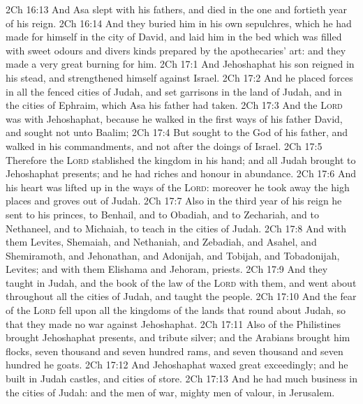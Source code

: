 \vs 2Ch 16:13 And Asa slept with his fathers, and died in the one and fortieth year of his reign.
\vs 2Ch 16:14 And they buried him in his own sepulchres, which he had made for himself in the city of David, and laid him in the bed which was filled with sweet odours and divers kinds  prepared by the apothecaries' art: and they made a very great burning for him.
\vs 2Ch 17:1 And Jehoshaphat his son reigned in his stead, and strengthened himself against Israel.
\vs 2Ch 17:2 And he placed forces in all the fenced cities of Judah, and set garrisons in the land of Judah, and in the cities of Ephraim, which Asa his father had taken.
\vs 2Ch 17:3 And the \textsc{Lord} was with Jehoshaphat, because he walked in the first ways of his father David, and sought not unto Baalim;
\vs 2Ch 17:4 But sought to the  God of his father, and walked in his commandments, and not after the doings of Israel.
\vs 2Ch 17:5 Therefore the \textsc{Lord} stablished the kingdom in his hand; and all Judah brought to Jehoshaphat presents; and he had riches and honour in abundance.
\vs 2Ch 17:6 And his heart was lifted up in the ways of the \textsc{Lord}: moreover he took away the high places and groves out of Judah.
\vs 2Ch 17:7 Also in the third year of his reign he sent to his princes,  to Benhail, and to Obadiah, and to Zechariah, and to Nethaneel, and to Michaiah, to teach in the cities of Judah.
\vs 2Ch 17:8 And with them  Levites,  Shemaiah, and Nethaniah, and Zebadiah, and Asahel, and Shemiramoth, and Jehonathan, and Adonijah, and Tobijah, and Tobadonijah, Levites; and with them Elishama and Jehoram, priests.
\vs 2Ch 17:9 And they taught in Judah, and  the book of the law of the \textsc{Lord} with them, and went about throughout all the cities of Judah, and taught the people.
\vs 2Ch 17:10 And the fear of the \textsc{Lord} fell upon all the kingdoms of the lands that  round about Judah, so that they made no war against Jehoshaphat.
\vs 2Ch 17:11 Also  of the Philistines brought Jehoshaphat presents, and tribute silver; and the Arabians brought him flocks, seven thousand and seven hundred rams, and seven thousand and seven hundred he goats.
\vs 2Ch 17:12 And Jehoshaphat waxed great exceedingly; and he built in Judah castles, and cities of store.
\vs 2Ch 17:13 And he had much business in the cities of Judah: and the men of war, mighty men of valour,  in Jerusalem.
